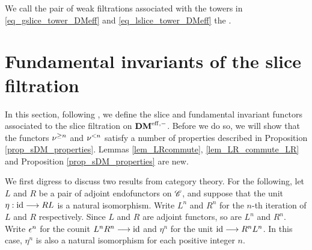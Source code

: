 We call the pair of weak filtrations associated with the
towers in \eqref{eq_gslice_tower_DMeff} and 
\eqref{eq_lslice_tower_DMeff} the .

\section{Fundamental invariants of the slice filtration}

In this section, following \cite[1.4 (iv, v)]{HuKa}, we define
the slice and fundamental invariant functors associated to the
slice filtration on $\mathbf{DM}^{\mathrm{eff},-}$. Before we do so, we will show that 
the functors $\nu^{\geq n}$ and $\nu^{< n}$ satisfy a number of 
properties described in Proposition \ref{prop_sDM_properties}.
Lemmas \ref{lem_LRcommute}, \ref{lem_LR_commute_LR} and 
Proposition \ref{prop_sDM_properties} are new.

We first digress to discuss two results from category theory.
For the following, let $L$ and $R$ be a pair of adjoint 
endofunctors on $\mathscr{C}$, and suppose that the unit $\eta : \mathrm{id} 
\longrightarrow RL$ is a natural isomorphism. Write $L^n$ and $R^n$ for the 
$n$-th iteration of $L$ and $R$ respectively. Since $L$ and $R$ 
are adjoint functors, so are $L^n$ and $R^n$. Write $\epsilon^n$ for 
the counit $L^n R^n \longrightarrow \mathrm{id}$ and $\eta^n$ for the unit $\mathrm{id} \longrightarrow 
R^n L^n$. In this case, $\eta^n$ is also a natural isomorphism for 
each positive integer $n$. 

